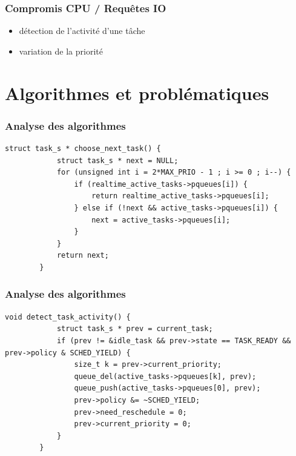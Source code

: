 \documentclass{beamer}
\begin{document}
\begin{frame}
    \frametitle{Compromis CPU / Requêtes IO}

    \begin{itemize}
        \item<2-> détection de l'activité d'une tâche
        \item<3-> variation de la priorité
    \end{itemize}

\end{frame}

\section{Algorithmes et problématiques}

\begin{frame}[fragile]
    \frametitle{Analyse des algorithmes}

    \begin{lstlisting}[caption=Choix de la prochaine tâche à exécuter]
        struct task_s * choose_next_task() {
            struct task_s * next = NULL;
            for (unsigned int i = 2*MAX_PRIO - 1 ; i >= 0 ; i--) {
                if (realtime_active_tasks->pqueues[i]) {
                    return realtime_active_tasks->pqueues[i];
                } else if (!next && active_tasks->pqueues[i]) {
                    next = active_tasks->pqueues[i];
                }
            }
            return next;
        }
    \end{lstlisting}
\end{frame}

\begin{frame}[fragile]
    \frametitle{Analyse des algorithmes}

    \begin{lstlisting}[caption=Détection de l'activité d'une tâche (IO/CPU)]
        void detect_task_activity() {
            struct task_s * prev = current_task;
            if (prev != &idle_task && prev->state == TASK_READY && prev->policy & SCHED_YIELD) {
                size_t k = prev->current_priority;
                queue_del(active_tasks->pqueues[k], prev);
                queue_push(active_tasks->pqueues[0], prev);
                prev->policy &= ~SCHED_YIELD;
                prev->need_reschedule = 0;
                prev->current_priority = 0;
            }
        }
    \end{lstlisting}
\end{frame}
\end{document}
